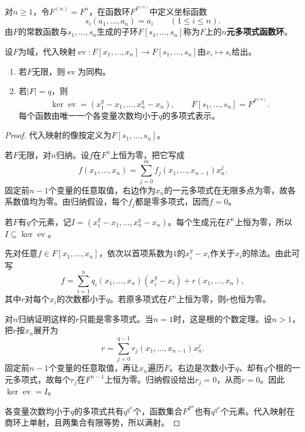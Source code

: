 \begin{definition}
对$n\geq1$，令$F^{(n)}=F^n$，在函数环$F^{F^{(n)}}$中定义坐标函数
\[
s_i(a_1,\ldots,a_n)=a_i\qquad(1\leq i\leq n).
\]
由$F$的常数函数与$s_1,\ldots,s_n$生成的子环$F[s_1,\ldots,s_n]$称为$F$上的\textbf{$n$元多项式函数环}。
\end{definition}

\begin{theorem}\label{p2:poly-functions-many}
设$F$为域，代入映射$\operatorname{ev}:F[x_1,\ldots,x_n]\to F[s_1,\ldots,s_n]$由$x_i\mapsto s_i$给出。
\begin{enumerate}
\item 若$F$无限，则$\operatorname{ev}$为同构。
\item 若$|F|=q$，则
\[
\ker\operatorname{ev}=(x_1^q-x_1,\ldots,x_n^q-x_n),
\qquad F[s_1,\ldots,s_n]=F^{F^{(n)}}.
\]
每个函数由唯一一个各变量次数均小于$q$的多项式表示。
\end{enumerate}
\end{theorem}
\begin{proof}
代入映射的像按定义为$F[s_1,\ldots,s_n]$。

若$F$无限，对$n$归纳。设$f$在$F^n$上恒为零，把它写成
\[
f(x_1,\ldots,x_n)
=\sum_{j=0}^m f_j(x_1,\ldots,x_{n-1})x_n^j.
\]
固定前$n-1$个变量的任意取值，右边作为$x_n$的一元多项式在无限多点为零，故各系数值均为零。由归纳假设，每个$f_j$都是零多项式，因而$f=0$。

若$F$有$q$个元素，记$I=(x_1^q-x_1,\ldots,x_n^q-x_n)$。每个生成元在$F^n$上恒为零，所以$I\subseteq\ker\operatorname{ev}$。

先对任意$f\in F[x_1,\ldots,x_n]$，依次以首项系数为$1$的$x_i^q-x_i$作关于$x_i$的除法。由此可写
\[
f=\sum_{i=1}^n q_i(x_1,\ldots,x_n)(x_i^q-x_i)
+r(x_1,\ldots,x_n),
\]
其中$r$对每个$x_i$的次数都小于$q$。若原多项式在$F^n$上恒为零，则$r$也恒为零。

对$n$归纳证明这样的$r$只能是零多项式。当$n=1$时，这是根的个数定理。设$n>1$，把$r$按$x_n$展开为
\[
r=\sum_{j=0}^{q-1}r_j(x_1,\ldots,x_{n-1})x_n^j.
\]
固定前$n-1$个变量的任意取值，再让$x_n$遍历$F$。右边是次数小于$q$、却有$q$个根的一元多项式，故每个$r_j$在$F^{n-1}$上恒为零。归纳假设给出$r_j=0$，从而$r=0$。因此$\ker\operatorname{ev}=I$。

各变量次数均小于$q$的多项式共有$q^{q^n}$个，函数集合$F^{F^n}$也有$q^{q^n}$个元素。代入映射在商环上单射，且两集合有限等势，所以满射。
\end{proof}
%
%
